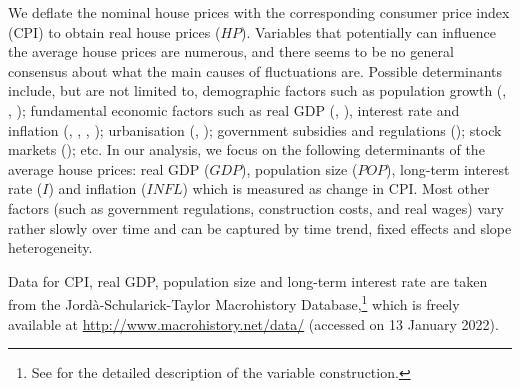 \documentclass[a4paper,12pt]{article}
\begin{document}
We deflate the nominal house prices with the corresponding consumer price index (CPI) to obtain real house prices ($HP$). Variables that potentially can influence the average house prices are numerous, and there seems to be no general consensus about what the main causes of fluctuations are. Possible determinants include, but are not limited to, demographic factors such as population growth (\citealt{Holly2010}, \citealt{Wang2014}, \citealt{Churchill2021}); fundamental economic factors such as real GDP (\citealt{Huang2013}, \citealt{Churchill2021}), interest rate and inflation (\citealt{Abelson2005}, \citealt{Otto2007}, \citealt{Huang2013}, \citealt{Jorda2015}); urbanisation (\citealt{Chen2011}, \citealt{Wang2017}); government subsidies and regulations (\citealt{Malpezzi1999}); stock markets (\citealt{Gallin2006}); etc. In our analysis, we focus on the following determinants of the average house prices: real GDP ($GDP$), population size ($POP$), long-term interest rate ($I$) and inflation ($INFL$) which is measured as change in CPI. Most other factors (such as government regulations, construction costs, and real wages) vary rather slowly over time and can be captured by time trend, fixed effects and slope heterogeneity.



Data for CPI, real GDP, population size and long-term interest rate are taken from the Jordà-Schularick-Taylor Macrohistory Database,\footnote{See \cite{Jorda2017} for the detailed description of the variable construction.} which is freely available at \linebreak\url{http://www.macrohistory.net/data/} (accessed on 13 January 2022).
\end{document}
